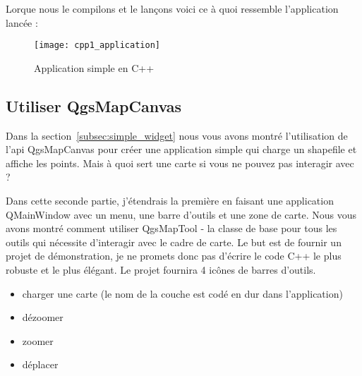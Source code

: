 Lorque nous le compilons et le lan\c{c}ons voici ce \`a quoi ressemble l'application lanc\'ee :
\begin{figure}[ht]
   \begin{center}
   \caption{Application simple en C++ \osxcaption}\label{fig:cpp1_application}\smallskip
   \texttt{[image: cpp1\_application]}
\end{center}
\end{figure}

\subsection{Utiliser QgsMapCanvas}

Dans la section~\ref{subsec:simple_widget} nous vous avons montr\'e l'utilisation 
de l'api QgsMapCanvas pour cr\'eer une application simple qui charge un shapefile 
et affiche les points. Mais \`a quoi sert une carte si vous ne pouvez pas 
interagir avec ?

Dans cette seconde partie, j'\'etendrais la premi\`ere en faisant une application 
QMainWindow avec un menu, une barre d'outils et une zone de carte. Nous vous 
avons montr\'e comment utiliser QgsMapTool - la classe de base pour tous les 
outils qui n\'ecessite d'interagir avec le cadre de carte.
Le but est de fournir un projet de d\'emonstration, je ne promets donc pas d'\'ecrire
 le code C++ le plus robuste et le plus \'el\'egant. Le projet fournira 4 ic\^ones de 
 barres d'outils.

\begin{itemize}
  \item charger une carte (le nom de la couche est cod\'e en dur dans l'application)
  \item d\'ezoomer
  \item zoomer
  \item d\'eplacer
\end{itemize}

